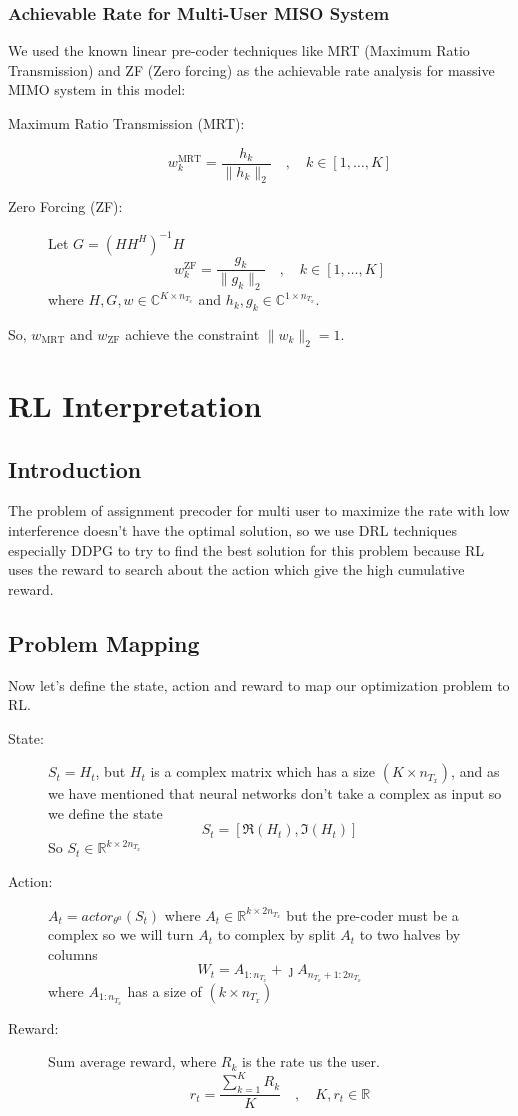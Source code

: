 \subsubsection{Achievable Rate for Multi-User MISO System}
We used the known linear pre-coder techniques like MRT (Maximum Ratio Transmission) and ZF (Zero forcing) as the achievable rate analysis for massive MIMO system in this model:
\begin{description}
    \item[Maximum Ratio Transmission (MRT):] \[ w_k^{\text{MRT}} = \frac{h_k}{\|h_k\|_2} \quad , \quad k \in [1, \ldots , K] \]
    \item[Zero Forcing (ZF):] Let $G = \left( H H^H \right)^{-1} H$ \[ w_k^{\text{ZF}} = \frac{g_k}{\|g_k\|_2} \quad , \quad k \in [1, \ldots , K] \]where $H, G, w \in \mathbb{C}^{K \times n_{T_x}}$ and $h_k, g_k \in \mathbb{C}^{1 \times n_{T_x}}$.
\end{description}
So, $w_{\text{MRT}}$ and $w_{\text{ZF}}$ achieve the constraint $\|w_k\|_2 = 1$.

\section{RL Interpretation}
\subsection{Introduction}
The problem of assignment precoder for multi user to maximize the rate with low interference doesn't have the optimal solution, so we use DRL techniques especially DDPG to try to find the best solution for this problem because RL uses the reward to search about the action which give the high cumulative reward.
\subsection{Problem Mapping}
Now let's define the state, action and reward to map our optimization problem to RL.
\begin{description}
    \item[State:] $S_t=H_t$, but $H_t$ is a complex matrix which has a size $({K \times n}_{T_x})$, and as we have mentioned that neural networks don't take a complex as input so we define the state \[ S_t = \left[ \Re(H_t) , \Im(H_t) \right] \]So $S_t \in \mathbb{R}^{k \times 2n_{T_x}}$
    \item[Action:] $A_t = actor_{\theta^a} (S_t)$ where $A_t \in \mathbb{R}^{k \times 2n_{T_x}}$ but the pre-coder must be a complex so we will turn $A_t$ to complex by split $A_t$ to two halves by columns \[ W_t = A_{1:n_{T_x}} + \jmath A_{n_{T_x}+1 : 2n_{T_x}} \]where $A_{1:n_{T_x}}$ has a size of $(k \times n_{T_x})$
    \item[Reward:] Sum average reward, where $R_k$ is the rate us the user.\[r_t = \frac{\sum_{k=1}^{K}R_k}{K} \quad , \quad K, r_t \in \mathbb{R}\]
\end{description}
